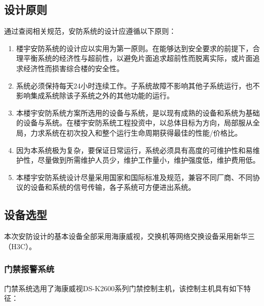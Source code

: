 \documentclass{gdutart}
\begin{document}
    \subsection{设计原则}
    通过查阅相关规范，安防系统的设计应遵循以下原则：
    \begin{enumerate}[label={(\arabic*)}]
      \item 楼宇安防系统的设计应以实用为第一原则。在能够达到安全要求的前提下，合理平衡系统的经济性与超前性，以避免片面追求超前性而脱离实际，或片面追求经济性而损害综合楼的安全性。
      \item 系统必须保持每天24小时连续工作。子系统故障不影响其他子系统运行，也不影响集成系统除该子系统之外的其他功能的运行。
      \item 本楼宇安防系统方案所选用的设备与系统，是以现有成熟的设备和系统为基础的设备与系统。在楼宇安防系统工程投资中，以总体目标为方向，局部服从全局，力求系统在初次投入和整个运行生命周期获得最佳的性能/价格比。
      \item 因为本系统极为复杂，要保证日常运行，系统必须具有高度的可维护性和易维护性，尽量做到所需维护人员少，维护工作量小，维护强度低，维护费用低。
      \item 本楼宇安防系统设计尽量采用国家和国际标准及规范，兼容不同厂商、不同协议的设备和系统的信号传输，各子系统可方便进出系统。
    \end{enumerate}

    \subsection{设备选型}
    本次安防设计的基本设备全部采用海康威视，交换机等网络交换设备采用新华三（H3C）。

      \subsubsection{门禁报警系统}
      门禁系统选用了海康威视DS-K2600系列门禁控制主机，该控制主机具有如下特征：
\end{document}
